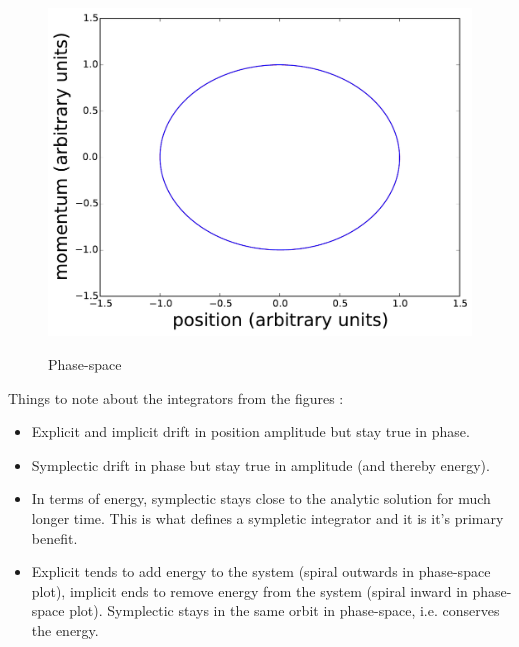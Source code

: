 \begin{figure}
{            \includegraphics[scale=0.24]{fig/ho/ho_phase-space_euler_symplectic.pdf}
            \label{fig:ho_phase-space_euler_symplectic}
        }
        \caption{Phase-space}
    \label{fig:ho_phase-space_euler}
\end{figure}

Things to note about the integrators from the figures :
\begin{itemize}
    \item Explicit and implicit drift in position amplitude but stay true in phase.
    \item Symplectic drift in phase but stay true in amplitude (and thereby energy).
    \item In terms of energy, symplectic stays close to the analytic solution for much longer time. This is what defines a sympletic integrator and it is it's primary benefit.
    \item Explicit tends to add energy to the system (spiral outwards in phase-space plot), implicit ends to remove energy from the system (spiral inward in phase-space plot). Symplectic stays in the same orbit in phase-space, i.e. conserves the energy.
\end{itemize}

